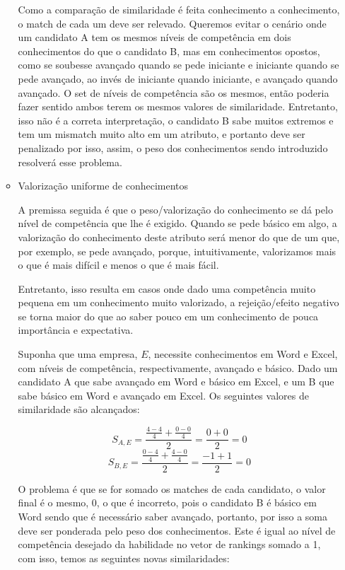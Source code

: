 \documentclass[preprint,12pt]{elsarticle}
\begin{document}
\begin{itemize}
\begin{itemize}
       Como a comparação de similaridade é feita conhecimento a conhecimento, o match de cada um deve ser relevado. Queremos evitar o cenário onde um candidato A tem os mesmos níveis de competência em dois conhecimentos do que o candidato B, mas em conhecimentos opostos, como se soubesse avançado quando se pede iniciante e iniciante quando se pede avançado, ao invés de iniciante quando iniciante, e avançado quando avançado. O set de níveis de competência são os mesmos, então poderia fazer sentido ambos terem os mesmos valores de similaridade. Entretanto, isso não é a correta interpretação, o candidato B sabe muitos extremos e tem um mismatch muito alto em um atributo, e portanto deve ser penalizado por isso, assim, o peso dos conhecimentos sendo introduzido resolverá esse problema.
       
       \item Valorização uniforme de conhecimentos
        
        A premissa seguida é que o peso/valorização do conhecimento se dá pelo nível de competência que lhe é exigido. Quando se pede básico em algo, a valorização do conhecimento deste atributo será menor do que de um que, por exemplo, se pede avançado, porque, intuitivamente, valorizamos mais o que é mais difícil e menos o que é mais fácil. 
        
        Entretanto, isso resulta em casos onde dado uma competência muito pequena em um conhecimento muito valorizado, a rejeição/efeito negativo se torna maior do que ao saber pouco em um conhecimento de pouca importância e expectativa.
        
        Suponha que uma empresa, $E$, necessite conhecimentos em Word e Excel, com níveis de competência, respectivamente, avançado e básico. Dado um candidato A que sabe avançado em Word e básico em Excel, e um B que sabe básico em Word e avançado em Excel. Os seguintes valores de similaridade são alcançados:
    
        $$ S_{A,E} = \frac{\tfrac{4 - 4}{4} + \tfrac{0 - 0}{4}}{2} = \frac{0 + 0}{2} =  0 $$
        $$ S_{B,E} = \frac{\tfrac{0 - 4}{4} + \tfrac{4 - 0}{4}}{2} = \frac{-1 + 1}{2} =  0 $$
        
        O problema é que se for somado os matches de cada candidato, o valor final é o mesmo, 0, o que é incorreto, pois o candidato B é básico em Word sendo que é necessário saber avançado, portanto, por isso a soma deve ser ponderada pelo peso dos conhecimentos. Este é igual ao nível de competência desejado da habilidade no vetor de rankings somado a 1, com isso, temos as seguintes novas similaridades:
        

\end{itemize}
\end{itemize}
\end{document}
